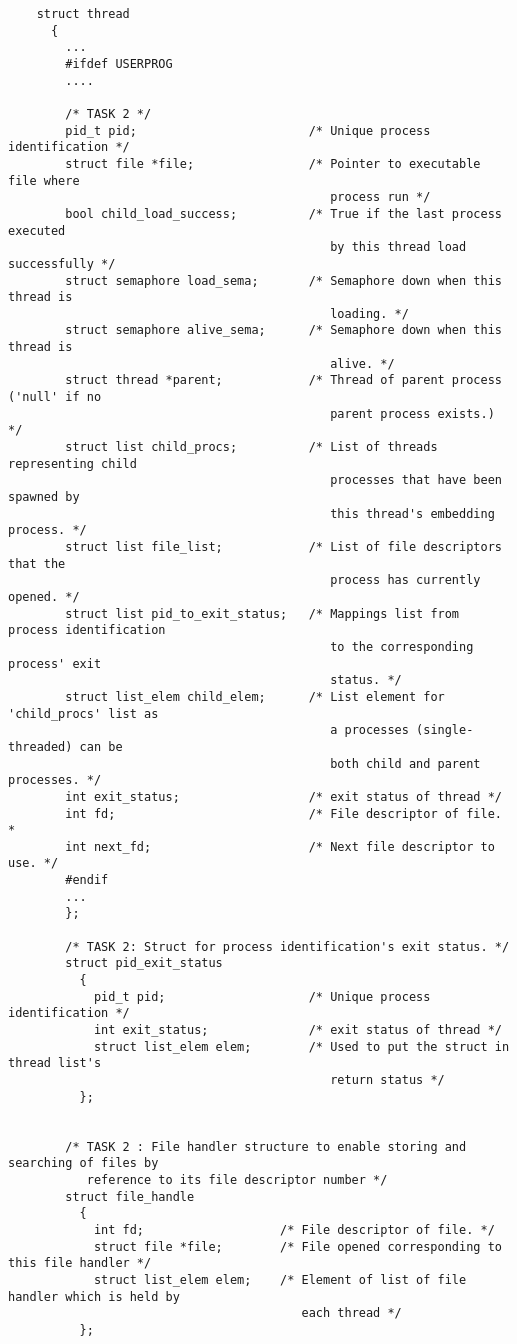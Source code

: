 \documentclass{article}
\begin{document}
\begin{lstlisting}
    struct thread
      {
        ...
        #ifdef USERPROG
        ....

        /* TASK 2 */
        pid_t pid;                        /* Unique process identification */
        struct file *file;                /* Pointer to executable file where
                                             process run */
        bool child_load_success;          /* True if the last process executed
                                             by this thread load successfully */
        struct semaphore load_sema;       /* Semaphore down when this thread is
                                             loading. */
        struct semaphore alive_sema;      /* Semaphore down when this thread is
                                             alive. */
        struct thread *parent;            /* Thread of parent process ('null' if no
                                             parent process exists.) */
        struct list child_procs;          /* List of threads representing child
                                             processes that have been spawned by
                                             this thread's embedding process. */
        struct list file_list;            /* List of file descriptors that the
                                             process has currently opened. */
        struct list pid_to_exit_status;   /* Mappings list from process identification
                                             to the corresponding process' exit
                                             status. */
        struct list_elem child_elem;      /* List element for 'child_procs' list as
                                             a processes (single-threaded) can be
                                             both child and parent processes. */
        int exit_status;                  /* exit status of thread */
        int fd;                           /* File descriptor of file. *
        int next_fd;                      /* Next file descriptor to use. */
        #endif
        ...
        };

        /* TASK 2: Struct for process identification's exit status. */
        struct pid_exit_status
          {
            pid_t pid;                    /* Unique process identification */
            int exit_status;              /* exit status of thread */
            struct list_elem elem;        /* Used to put the struct in thread list's
                                             return status */
          };


        /* TASK 2 : File handler structure to enable storing and searching of files by
           reference to its file descriptor number */
        struct file_handle
          {
            int fd;                   /* File descriptor of file. */
            struct file *file;        /* File opened corresponding to this file handler */
            struct list_elem elem;    /* Element of list of file handler which is held by
                                         each thread */
          };
\end{lstlisting}
\end{document}
